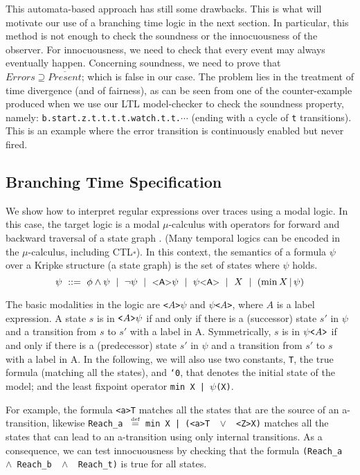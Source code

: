 \documentclass[a4paper]{scrartcl}
\def\vars#1{\textsf{\small #1}}
\newcommand{\eqdef}{\ensuremath{\overset{\text{\tiny def}}{=}}}
\newcommand{\kleene}{\ensuremath{\mathclose{\overset{*}{\ }}}}
\newcommand{\ltl}[1]{\texttt{#1}}
\newcommand{\ltland}{\,\ensuremath{\wedge}\,}\newcommand{\ltlo}{\,\ensuremath{\text{\texttt{o}}}\,}\newcommand{\ltls}{\,\ensuremath{\text{\texttt{*}}}\,}\newcommand{\ltlU}{\,\ensuremath{\text{\texttt{U}}}\,}\newcommand{\ltlwand}{\,\ensuremath{\text{\texttt{-*}}}\,}\newcommand{\ltlor}{\,\ensuremath{\vee}\,}\newcommand{\kirc}{\mathrel{\circ}}
\begin{document}
This automata-based approach has still some drawbacks. This is what
will motivate our use of a branching time logic in the next
section. In particular, this method is not enough to check the
soundness or the innocuousness of the observer. For innocuousness, we
need to check that every event may always eventually
happen. Concerning soundness, we need to prove that $\mathit{Errors}
\supseteq \overline{\mathit{Present}}$; which is false in our case.
The problem lies in the treatment of time divergence (and of
fairness), as can be seen from one of the counter-example produced
when we use our LTL model-checker to check the soundness property,
namely: \ltl{b.start.z.t.t.t.t.watch.t.t.$\cdots$} (ending with a
cycle of \texttt{t} transitions). This is an example where the error
transition is continuously enabled but never fired.

\subsection{Branching Time Specification} 

We show how to interpret regular expressions over traces using a modal
logic. In this case, the target logic is a modal $\mu$-calculus with
operators for forward and backward traversal of a state graph . (Many
temporal logics can be encoded in the $\mu$-calculus, including
CTL\kleene). In this context, the semantics of a formula $\psi$ over a
Kripke structure (a state graph) is the set of states where $\psi$
holds.
\[
\psi \ ::=\ \phi \wedge \psi \ \mid\ \neg \psi \ \mid \
\vars{<A>}\psi\ \mid\ \psi\vars{<A>} \ \mid\ X \ \mid\ (\min X\,|\,
\psi) \]

The basic modalities in the logic are \ltl{<$A$>$\psi$} and
\ltl{$\psi$<$A$>}, where $A$ is a label expression.  A state $s$ is in
$\text{\ltl{<$A$>}}\psi$ if and only if there is a (successor) state
$s'$ in $\psi$ and a transition from $s$ to $s'$ with a label in
A. Symmetrically, $s$ is in $\psi\text{\ltl{<$A$>}}$ if and only if
there is a (predecessor) state $s'$ in $\psi$ and a transition from
$s'$ to $s$ with a label in A. In the following, we will also use two
constants, \ltl{T}, the true formula (matching all the states), and
\ltl{`0}, that denotes the initial state of the model; and the least
fixpoint operator \ltl{min X | $\psi$(X)}.

For example, the formula \ltl{<\vars{a}>T} matches all the states that
are the source of an \vars{a}-transition, likewise
\ltl{Reach\_\vars{a}} \ \eqdef\ \ltl{min X\,|\,(<\vars{a}>T \ltlor
  <Z>X)} matches all the states that can lead to an
\vars{a}-transition using only internal transitions. As a consequence,
we can test innocuousness by checking that the formula
\ltl{(Reach\_\vars{a} \ltland Reach\_\vars{b} \ltland
  Reach\_\vars{t})} is true for all states.
\end{document}
